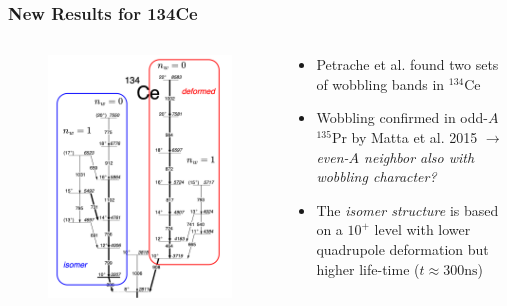 \documentclass{beamer}
\begin{document}
\begin{frame}
  \frametitle{New Results for 134Ce}
\begin{columns}
  \begin{column}{0.4\textwidth}
    \begin{figure}
      \centering
      \includegraphics[scale=0.15]{Figs/triaxial-shapes-ce-134.png}
    \end{figure}
  \end{column}
  \begin{column}{0.6\textwidth}
    \begin{itemize}
      \item Petrache et al. found two sets of wobbling bands in $^{134}$Ce
      \item Wobbling confirmed in odd-$A$ $^{135}$Pr by Matta et al. 2015 $\rightarrow$ \emph{even-$A$ neighbor also with wobbling character?}
      \item The \emph{isomer structure} is based on a $10^+$ level with lower quadrupole deformation but higher life-time ($t\approx 300 \text{ns}$)
    \end{itemize}
  \end{column}
\end{columns}
\end{frame}
\end{document}
